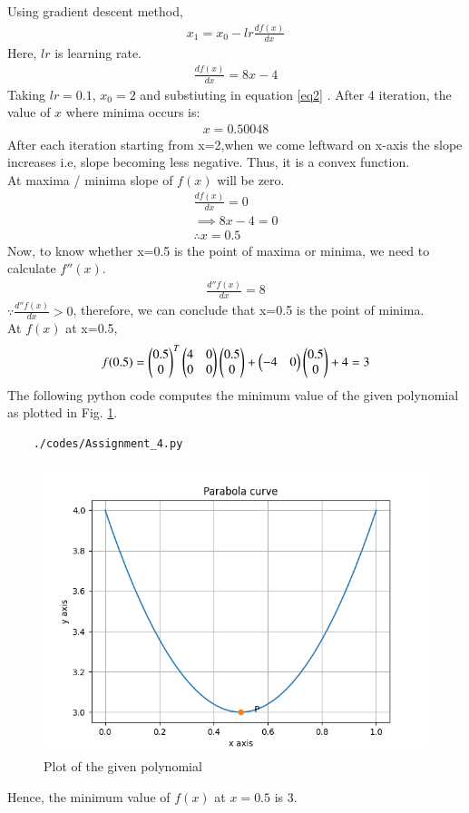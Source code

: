\documentclass[journal,12pt,twocolumn]{IEEEtran}
\begin{document}
    Using gradient descent method,
    \begin{align}
    x_1=x_0-lr\frac{df(x)}{dx} \label{eq2}
    \end{align}
    Here, $lr$ is learning rate.\\
    \begin{align}
    \frac{df(x)}{dx}=8x-4
\end{align}
    Taking $lr=0.1$, $x_0=2$ and substiuting in equation \ref{eq2} . After 4 iteration, the value of $x$ where minima occurs is:
    \begin{align}
    x=0.50048
    \end{align}
After each iteration starting from x=2,when we come leftward on x-axis the slope increases i.e, slope becoming less negative. Thus, it is a convex function.\\
At maxima / minima slope of $f(x)$ will be zero.
\begin{align}
    \frac{df(x)}{dx}=0\\
	\implies 8x-4=0\\
    \therefore x=0.5
\end{align}
Now, to know whether x=0.5 is the point of maxima or minima, we need to calculate $f''(x)$.
\begin{align}
    \frac{d''f(x)}{dx}=8
\end{align}
$\because   \frac{d''f(x)}{dx}>0$, therefore,  we can conclude that x=0.5 is the point of minima.\\
At $f(x)$ at x=0.5,
\begin{align}
    f(0.5)=\begin{pmatrix}0.5\\0\end{pmatrix}^T\begin{pmatrix}4&0\\0&0\end{pmatrix}\begin{pmatrix}0.5\\0\end{pmatrix}  + \begin{pmatrix}-4&0\end{pmatrix}\begin{pmatrix}0.5\\0\end{pmatrix} +4 = 3
\end{align}
The following python code computes the minimum value of the given polynomial as plotted in Fig. \ref{fig:5.1}.
	\begin{lstlisting}
	./codes/Assignment_4.py
	\end{lstlisting}
	\begin{figure}[!ht]
	\centering
	\includegraphics[width=\columnwidth]{Figure_1.png}
	\caption{Plot of the given polynomial}
	\label{fig:5.1}	
	\end{figure}
Hence, the minimum value of $f(x)$ at $x=0.5$ is 3.
\end{document}
